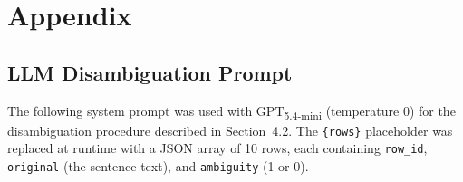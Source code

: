 \chapter{Appendix}

\section{LLM Disambiguation Prompt}
\label{app:disambiguation_prompt}

The following system prompt was used with GPT\textsubscript{5.4-mini} (temperature 0) for the disambiguation procedure described in Section~4.2. The \texttt{\{rows\}} placeholder was replaced at runtime with a JSON array of 10 rows, each containing \texttt{row\_id}, \texttt{original} (the sentence text), and \texttt{ambiguity} (1 or 0).


